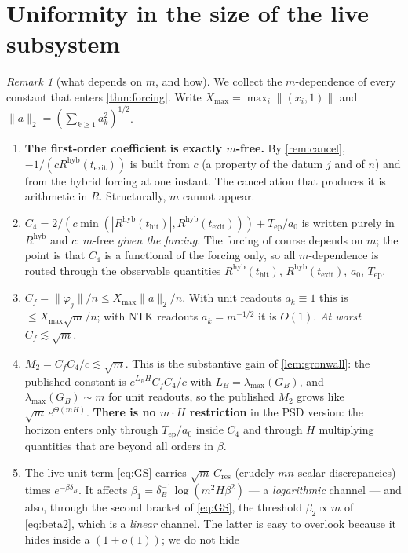 \documentclass[11pt]{article}
\theoremstyle{definition}
\theoremstyle{remark}
\newtheorem{remark}{Remark}
\newcommand{\hyb}{\mathrm{hyb}}
\newcommand{\thit}{t_{\mathrm{hit}}}
\newcommand{\texit}{t_{\mathrm{exit}}}
\newcommand{\Tep}{T_{\mathrm{ep}}}
\begin{document}
\section{Uniformity in the size of the live subsystem}\label{sec:uniform}

\begin{remark}[what depends on $m$, and how]\label{rem:uniform}
We collect the $m$-dependence of every constant that enters
\cref{thm:forcing}. Write $X_{\max}=\max_i\|(x_i,1)\|$ and
$\|a\|_2=(\sum_{k\ge1}a_k^2)^{1/2}$.
\begin{enumerate}
\item[(U1)] \textbf{The first-order coefficient is exactly $m$-free.} By
\cref{rem:cancel}, $-1/(cR^{\hyb}(\texit))$ is built from $c$ (a property of the
datum $j$ and of $n$) and from the hybrid forcing at one instant. The cancellation
that produces it is arithmetic in $R$. Structurally, $m$ cannot appear.
\item[(U2)] $C_4=2/(c\min(|R^{\hyb}(\thit)|,R^{\hyb}(\texit)))+\Tep/a_0$ is
written purely in $R^{\hyb}$ and $c$: $m$-free \emph{given the forcing}. The
forcing of course depends on $m$; the point is that $C_4$ is a functional of the
forcing only, so all $m$-dependence is routed through the observable quantities
$R^{\hyb}(\thit)$, $R^{\hyb}(\texit)$, $a_0$, $\Tep$.
\item[(U3)] $C_f=\|\varphi_j\|/n\le X_{\max}\|a\|_2/n$. With unit readouts
$a_k\equiv1$ this is $\le X_{\max}\sqrt m/n$; with NTK readouts
$a_k=m^{-1/2}$ it is $O(1)$. \emph{At worst $C_f\lesssim\sqrt m$.}
\item[(U4)] $M_2=C_fC_4/c\lesssim\sqrt m$. This is the substantive gain of
\cref{lem:gronwall}: the published constant is $e^{L_BH}C_fC_4/c$ with
$L_B=\lambda_{\max}(G_B)$, and $\lambda_{\max}(G_B)\sim m$ for unit readouts, so
the published $M_2$ grows like $\sqrt m\,e^{\Theta(mH)}$. \textbf{There is no
$m\cdot H$ restriction} in the PSD version: the horizon enters only through
$\Tep/a_0$ inside $C_4$ and through $H$ multiplying quantities that are beyond
all orders in $\beta$.
\item[(U5)] The live-unit term \eqref{eq:GS} carries $\sqrt m\,C_{\mathrm{res}}$
(crudely $mn$ scalar discrepancies) times $e^{-\beta\delta_B}$. It affects
$\beta_1=\delta_B^{-1}\log(m^2H\beta^2)$ --- a \emph{logarithmic} channel --- and
also, through the second bracket of \eqref{eq:GS}, the threshold
$\beta_2\propto m$ of \eqref{eq:beta2}, which is a \emph{linear} channel. The
latter is easy to overlook because it hides inside a $(1+o(1))$; we do not hide

\end{enumerate}
\end{remark}
\end{document}
